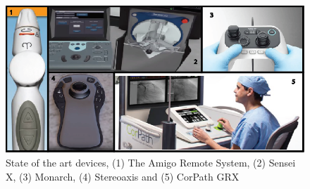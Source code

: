 \begin{figure}[ht]
   \centering
   \includegraphics[width=1.0\textwidth]{img/statedevices.PNG}
   \caption{State of the art devices, (1) The Amigo Remote System, (2) Sensei X, (3) Monarch, (4) Stereoaxis and (5) CorPath GRX}
   \label{img:statedevices}
\end{figure}


